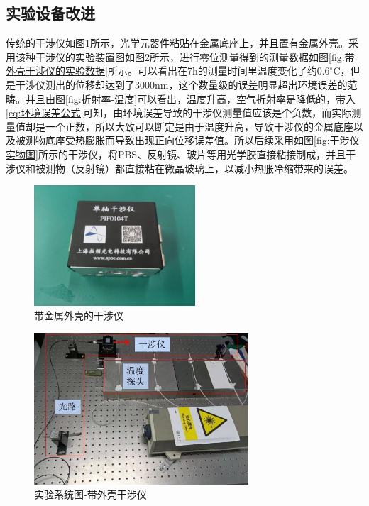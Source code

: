 \subsection{实验设备改进}
传统的干涉仪如图\ref{fig:带金属外壳的干涉仪}所示，光学元器件粘贴在金属底座上，并且置有金属外壳。采用该种干涉仪的实验装置图如图\ref{fig:实验系统图-带外壳干涉仪}所示，进行零位测量得到的测量数据如图\ref{fig:带外壳干涉仪的实验数据}所示。可以看出在7h的测量时间里温度变化了约$0.6^{\circ} \mathrm{C}$，但是干涉仪测出的位移却达到了3000nm，这个数量级的误差明显超出环境误差的范畴。并且由图\ref{fig:折射率-温度}可以看出，温度升高，空气折射率是降低的，带入\eqref{eq:环境误差公式}可知，由环境误差导致的干涉仪测量值应该是个负数，而实际测量值却是一个正数，所以大致可以断定是由于温度升高，导致干涉仪的金属底座以及被测物底座受热膨胀而导致出现正向位移误差值。所以后续采用如图\ref{fig:干涉仪实物图}所示的干涉仪，将PBS、反射镜、玻片等用光学胶直接粘接制成，并且干涉仪和被测物（反射镜）都直接粘在微晶玻璃上，以减小热胀冷缩带来的误差。
\begin{figure}[htb]
    \centering
    \includegraphics[width=6cm]{fig/3-fig/带金属外壳的干涉仪.jpg}
    \caption{带金属外壳的干涉仪}
    \label{fig:带金属外壳的干涉仪}
\end{figure}
\begin{figure}[htb]
    \centering
    \includegraphics[width=8cm]{fig/3-fig/实验系统图-带外壳干涉仪.jpg}
    \caption{实验系统图-带外壳干涉仪}
    \label{fig:实验系统图-带外壳干涉仪}
\end{figure}
